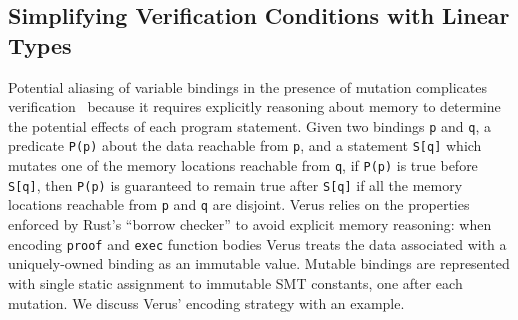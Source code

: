 
\subsection{Simplifying Verification Conditions with Linear Types}\label{sec:encoding}

Potential aliasing of variable bindings in the presence of mutation
complicates verification~\cite{on-the-frame-problem}
because it requires explicitly reasoning about memory to determine the potential effects 
of each program statement. Given two bindings \verb`p` and \verb`q`, a predicate \verb`P(p)` about
the data reachable from \verb`p`,
and a statement \verb`S[q]` which mutates one of the memory locations reachable from \verb`q`,
if \verb`P(p)` is true before \verb`S[q]`, then \verb`P(p)` is guaranteed to remain true
after \verb`S[q]` if all the memory locations reachable from \verb`p` and \verb`q` are
disjoint.
Verus relies on the properties enforced by Rust's ``borrow checker'' to avoid explicit memory
reasoning: when encoding \verb`proof` and \verb`exec` function bodies
Verus treats the data associated with a uniquely-owned binding as an immutable value.
Mutable bindings are represented with single static assignment to immutable SMT constants,
one after each mutation.
We discuss Verus' encoding strategy with an example.

